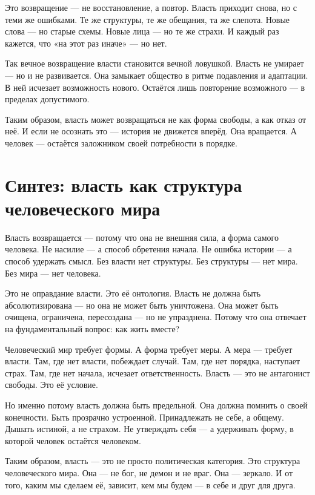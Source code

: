 Это возвращение — не восстановление, а повтор. Власть приходит снова, но с теми же ошибками. Те же структуры, те же обещания, та же слепота. Новые слова — но старые схемы. Новые лица — но те же страхи. И каждый раз кажется, что «на этот раз иначе» — но нет.

Так вечное возвращение власти становится вечной ловушкой. Власть не умирает — но и не развивается. Она замыкает общество в ритме подавления и адаптации. В ней исчезает возможность нового. Остаётся лишь повторение возможного — в пределах допустимого.

Таким образом, власть может возвращаться не как форма свободы, а как отказ от неё. И если не осознать это — история не движется вперёд. Она вращается. А человек — остаётся заложником своей потребности в порядке.

\section{Синтез: власть как структура человеческого мира}

Власть возвращается — потому что она не внешняя сила, а форма самого человека. Не насилие — а способ обретения начала. Не ошибка истории — а способ удержать смысл. Без власти нет структуры. Без структуры — нет мира. Без мира — нет человека.

Это не оправдание власти. Это её онтология. Власть не должна быть абсолютизирована — но она не может быть уничтожена. Она может быть очищена, ограничена, пересоздана — но не упразднена. Потому что она отвечает на фундаментальный вопрос: как жить вместе?

Человеческий мир требует формы. А форма требует меры. А мера — требует власти. Там, где нет власти, побеждает случай. Там, где нет порядка, наступает страх. Там, где нет начала, исчезает ответственность. Власть — это не антагонист свободы. Это её условие.

Но именно потому власть должна быть предельной. Она должна помнить о своей конечности. Быть прозрачно устроенной. Принадлежать не себе, а общему. Дышать истиной, а не страхом. Не утверждать себя — а удерживать форму, в которой человек остаётся человеком.

Таким образом, власть — это не просто политическая категория. Это структура человеческого мира. Она — не бог, не демон и не враг. Она — зеркало. И от того, каким мы сделаем её, зависит, кем мы будем — в себе и друг для друга.

